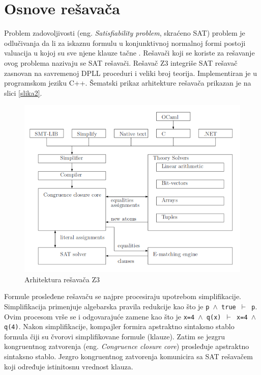 \documentclass[12pt,oneside]{memoir}
\begin{document}
\section{Osnove rešavača}  \label{sec:num1}
Problem zadovoljivosti (eng. \textit{Satisfiability problem}, skraćeno SAT) problem je odlučivanja da li za iskaznu formulu u konjunktivnoj normalnoj formi postoji valuacija u kojoj su sve njene 
klauze tačne \cite{Handbook}. 
Rešavači koji se koriste za rešavanje ovog problema nazivaju se SAT rešavači.   
Rešavač Z3 integriše SAT rešavač zasnovan na savremenoj DPLL proceduri i veliki broj teorija. 
Implementiran je u programskom jeziku C++. Šematski prikaz arhitekture rešavača \cite{EfficientSMTSolver} prikazan je na slici \ref{slika2}. 
\begin{figure}[!ht]\label{slika2}
  \centering
  \includegraphics[width=1\textwidth]{arhitektura.png}
  \caption{Arhitektura rešavača Z3}
  \label{fig:arhitektura}
\end{figure}
\par
Formule prosleđene rešavaču se najpre procesiraju upotrebom simplifikacije. Simplifikacija primenjuje algebarska pravila redukcije kao što je \texttt{p $\land$ true $\vdash$ p}. Ovim procesom vrše se i odgovarajuće zamene kao što je \texttt{x=4 $\land$ q(x) $\vdash$ x=4 $\land$ q(4)}.
Nakon simplifikacije, kompajler formira apstraktno sintaksno stablo formula čiji su čvorovi simplifikovane formule (klauze). Zatim se jezgru kongruentnog zatvorenja (eng. 
\textit{Congruence closure core}) prosleđuje apstraktno sintaksno stablo. Jezgro kongruentnog zatvorenja komunicira sa SAT rešavačem koji određuje istinitosnu vrednost klauza. 
\par
\end{document}
